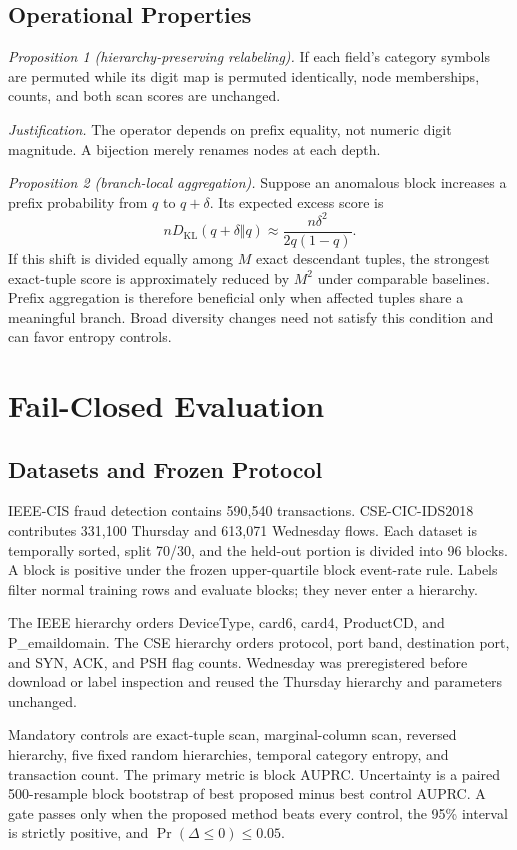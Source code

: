 \documentclass[journal]{IEEEtran}
\begin{document}
\subsection{Operational Properties}
\textit{Proposition 1 (hierarchy-preserving relabeling).} If each field's category symbols are permuted while its digit map is permuted identically, node memberships, counts, and both scan scores are unchanged.

\textit{Justification.} The operator depends on prefix equality, not numeric digit magnitude. A bijection merely renames nodes at each depth.

\textit{Proposition 2 (branch-local aggregation).} Suppose an anomalous block increases a prefix probability from $q$ to $q+\delta$. Its expected excess score is
\begin{equation}
 nD_{\mathrm{KL}}(q+\delta\Vert q)
 \approx \frac{n\delta^2}{2q(1-q)}.
\end{equation}
If this shift is divided equally among $M$ exact descendant tuples, the strongest exact-tuple score is approximately reduced by $M^2$ under comparable baselines. Prefix aggregation is therefore beneficial only when affected tuples share a meaningful branch. Broad diversity changes need not satisfy this condition and can favor entropy controls.

\section{Fail-Closed Evaluation}
\subsection{Datasets and Frozen Protocol}
IEEE-CIS fraud detection \cite{ieeecis2019} contains 590,540 transactions. CSE-CIC-IDS2018 \cite{sharafaldin2018ids} contributes 331,100 Thursday and 613,071 Wednesday flows. Each dataset is temporally sorted, split 70/30, and the held-out portion is divided into 96 blocks. A block is positive under the frozen upper-quartile block event-rate rule. Labels filter normal training rows and evaluate blocks; they never enter a hierarchy.

The IEEE hierarchy orders DeviceType, card6, card4, ProductCD, and P\_emaildomain. The CSE hierarchy orders protocol, port band, destination port, and SYN, ACK, and PSH flag counts. Wednesday was preregistered before download or label inspection and reused the Thursday hierarchy and parameters unchanged.

Mandatory controls are exact-tuple scan, marginal-column scan, reversed hierarchy, five fixed random hierarchies, temporal category entropy, and transaction count. The primary metric is block AUPRC. Uncertainty is a paired 500-resample block bootstrap of best proposed minus best control AUPRC. A gate passes only when the proposed method beats every control, the 95\% interval is strictly positive, and $\Pr(\Delta\leq0)\leq0.05$.
\end{document}
